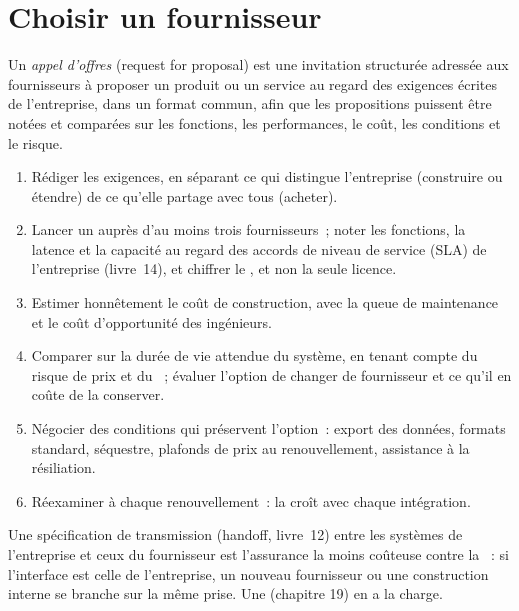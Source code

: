 \section{Choisir un fournisseur}

\begin{definition}\label{def:fm:build-against-buy:rfp}
Un \emph{appel d'offres} (request for proposal) est une invitation structurée adressée aux fournisseurs à proposer un produit ou un service au regard des
exigences écrites de l'entreprise, dans un format commun, afin que les propositions puissent être notées et comparées sur les fonctions, les performances, le coût, les conditions et le risque.
\end{definition}

\begin{method}\label{met:fm:build-against-buy:run}
\begin{enumerate}
\item Rédiger les exigences, en séparant ce qui distingue l'entreprise (construire ou étendre) de ce qu'elle partage avec tous (acheter).
\item Lancer un  auprès d'au moins trois fournisseurs~; noter les fonctions, la latence et la capacité au regard des accords de niveau de service
(SLA) de l'entreprise (livre~14), et chiffrer le , et non la seule licence.
\item Estimer honnêtement le coût de construction, avec la queue de maintenance et le coût d'opportunité des ingénieurs.
\item Comparer sur la durée de vie attendue du système, en tenant compte du risque de prix et du ~; évaluer l'option de changer de fournisseur et ce qu'il en coûte de la conserver.
\item Négocier des conditions qui préservent l'option~: export des données, formats standard, séquestre, plafonds de prix au renouvellement, assistance à la résiliation.
\item Réexaminer à chaque renouvellement~: la  croît avec chaque intégration.
\end{enumerate}
\end{method}

Une spécification de transmission (handoff, livre~12) entre les systèmes de l'entreprise et ceux du fournisseur est l'assurance la moins coûteuse contre la ~: si l'interface est celle de l'entreprise, un
nouveau fournisseur ou une construction interne se branche sur la même prise. Une  (chapitre 19) en a la charge.

